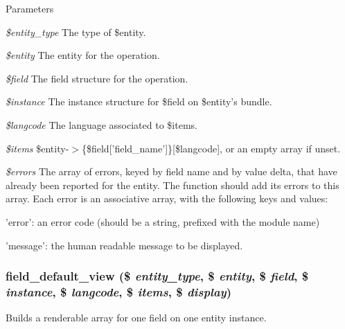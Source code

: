 \begin{DoxyParams}{Parameters}
\item[{\em \$entity\_\-type}]The type of \$entity. \item[{\em \$entity}]The entity for the operation. \item[{\em \$field}]The field structure for the operation. \item[{\em \$instance}]The instance structure for \$field on \$entity's bundle. \item[{\em \$langcode}]The language associated to \$items. \item[{\em \$items}]\$entity-\/$>$\{\$field\mbox{[}'field\_\-name'\mbox{]}\}\mbox{[}\$langcode\mbox{]}, or an empty array if unset. \item[{\em \$errors}]The array of errors, keyed by field name and by value delta, that have already been reported for the entity. The function should add its errors to this array. Each error is an associative array, with the following keys and values:
\begin{DoxyItemize}
\item 'error': an error code (should be a string, prefixed with the module name)
\item 'message': the human readable message to be displayed. 
\end{DoxyItemize}\end{DoxyParams}
\hypertarget{field_8default_8inc_a804bfc6de7277945228d4949f82bc429}{
\subsubsection[{field\_\-default\_\-view}]{\setlength{\rightskip}{0pt plus 5cm}field\_\-default\_\-view (\$ {\em entity\_\-type}, \/  \$ {\em entity}, \/  \$ {\em field}, \/  \$ {\em instance}, \/  \$ {\em langcode}, \/  \$ {\em items}, \/  \$ {\em display})}}
\label{field_8default_8inc_a804bfc6de7277945228d4949f82bc429}
Builds a renderable array for one field on one entity instance.


